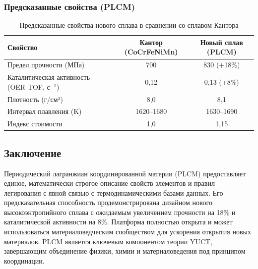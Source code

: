 \documentclass[12pt,a4paper]{article}
\begin{document}
	\subsubsection{Предсказанные свойства (PLCM)}
	\begin{table}[htbp]
		\centering
		\caption{Предсказанные свойства нового сплава в сравнении со сплавом Кантора}
		\label{tab:comparison}
		\begin{tabular}{lcc}
			\toprule
			Свойство & Кантор (CoCrFeNiMn) & Новый сплав (PLCM) \\
			\midrule
			Предел прочности (МПа) & 700 & 830 (+18\%) \\
			Каталитическая активность (OER TOF, с\(^{-1}\)) & 0,12 & 0,13 (+8\%) \\
			Плотность (г/см³) & 8,0 & 8,1 \\
			Интервал плавления (K) & 1620–1680 & 1630–1690 \\
			Индекс стоимости & 1,0 & 1,15 \\
			\bottomrule
		\end{tabular}
	\end{table}
	
	\subsection{Заключение}
	
	Периодический лагранжиан координированной материи (PLCM) предоставляет единое, математически строгое описание свойств элементов и правил легирования с явной связью с термодинамическими базами данных. Его предсказательная способность продемонстрирована дизайном нового высокоэнтропийного сплава с ожидаемым увеличением прочности на 18\% и каталитической активности на 8\%. Платформа полностью открыта и может использоваться материаловедческим сообществом для ускорения открытия новых материалов. PLCM является ключевым компонентом теории YUCT, завершающим объединение физики, химии и материаловедения под принципом координации.
	
	\appendix
	
\end{document}
